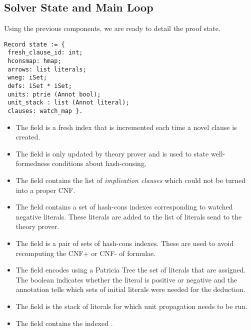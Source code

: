 \documentclass[utf8,a4paper,UKenglish,cleveref, autoref, thm-restate]{lipics-v2019}
\begin{document}
\subsection{Solver State and Main Loop}
Using the previous components, we are ready to detail the proof state. %
\begin{verbatim}
Record state := {
 fresh_clause_id: int;
 hconsmap: hmap;
 arrows: list literals;
 wneg: iSet;
 defs: iSet * iSet;
 units: ptrie (Annot bool);
 unit_stack : list (Annot literal);
 clauses: watch_map }.
\end{verbatim}
\begin{itemize}
\item The field  is a fresh index that is incremented
  each time a novel clause is created.
\item The field  is only
updated by theory prover and is used to state well-formedness
conditions about hash-consing.
\item The field  contains the
list of \emph{implication clauses} which could not be turned into a proper CNF.
%
\item The field  contains a set of hash-cons indexes
corresponding to watched negative literals. These literals are added
to the list of literals send to the theory prover.
\item The field  is a pair of sets of hash-cons indexes.
These are used to avoid recomputing the CNF+ or CNF- of formulae.
\item The field  encodes using a Patricia Tree the set of
literals that are assigned.  The boolean indicates whether the literal
is positive or negative and the annotation tells which sets of initial
literals were needed for the deduction.
\item The field  is the stack of literals for which
  unit propagation needs to be run.
\item The field  contains the indexed .
\end{itemize}
\end{document}
